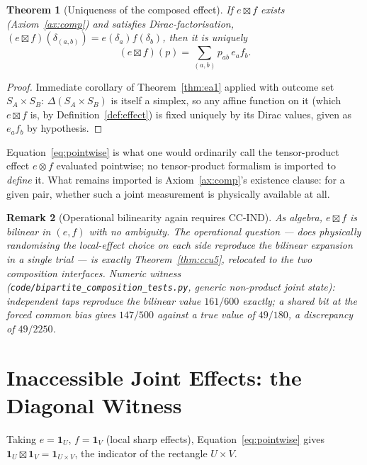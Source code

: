 \documentclass[11pt,a4paper]{article}
\newtheorem{theorem}{Theorem}[section]
\newtheorem{remark}[theorem]{Remark}
\newcommand{\SA}{S_A}
\newcommand{\SB}{S_B}
\newcommand{\dd}{\delta}
\begin{document}
    \begin{theorem}[Uniqueness of the composed effect]
      \label{thm:bc1}
      If $e \boxtimes f$ exists (Axiom~\ref{ax:comp}) and satisfies Dirac-factorisation,
      $(e \boxtimes f)(\dd_{(a,b)}) = e(\dd_a) f(\dd_b)$, then it is uniquely
      \begin{equation}
        \label{eq:pointwise}
        (e \boxtimes f)(p) = \sum_{(a,b)} p_{ab}\, e_a f_b.
      \end{equation}
    \end{theorem}

    \begin{proof}
      Immediate corollary of Theorem~\ref{thm:ea1} applied with outcome set $\SA \times \SB$:
      $\Delta(\SA \times \SB)$ is itself a simplex, so any affine function on it (which $e \boxtimes f$ is,
      by Definition~\ref{def:effect}) is fixed uniquely by its Dirac values, given as $e_a f_b$ by
      hypothesis.
    \end{proof}

    Equation~\eqref{eq:pointwise} is what one would ordinarily call the tensor-product effect $e \otimes f$
    evaluated pointwise; no tensor-product formalism is imported to \emph{define} it.
    What remains imported is Axiom~\ref{ax:comp}'s existence clause: for a given pair, whether such a joint
    measurement is physically available at all.

    \begin{remark}[Operational bilinearity again requires CC-IND]
      \label{rem:bc2}
      As algebra, $e \boxtimes f$ is bilinear in $(e,f)$ with no ambiguity.
      The operational question --- does physically randomising the local-effect choice on each side
      reproduce the bilinear expansion in a single trial --- is exactly Theorem~\ref{thm:ccu5}, relocated to
      the two composition interfaces.
      Numeric witness (\texttt{code/bipartite\_composition\_tests.py}, generic non-product joint state):
      independent taps reproduce the bilinear value $161/600$ exactly; a shared bit at the forced common
      bias gives $147/500$ against a true value of $49/180$, a discrepancy of $49/2250$.
    \end{remark}

  \section{Inaccessible Joint Effects: the Diagonal Witness}
  \label{sec:diagonal}

    Taking $e = \mathbf{1}_U$, $f = \mathbf{1}_V$ (local sharp effects), Equation~\eqref{eq:pointwise} gives
    $\mathbf{1}_U \boxtimes \mathbf{1}_V = \mathbf{1}_{U \times V}$, the indicator of the rectangle
    $U \times V$.
\end{document}
